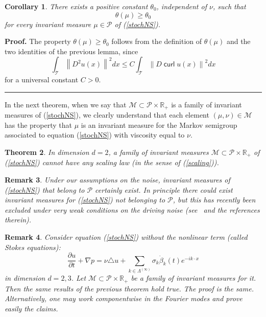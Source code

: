 \documentclass[11pt]{preprint}
\DeclareMathOperator{\Curl}{\mathsf{curl}}
\newtheorem{theorem}{Theorem}[section]
\newtheorem{corollary}[theorem]{Corollary}
\newtheorem{remark}[theorem]{Remark}
\newenvironment{proof}[1][Proof]{\textbf{#1.} }{\ \rule{0.5em}{0.5em}}
\begin{document}
\begin{corollary}
There exists a positive constant $\theta_{0}$, independent of $\nu$, such
that
\[
\theta\left(  \mu\right)  \geq\theta_{0}%
\]
for every invariant measure $\mu\in\mathcal{P}$ of (\ref{stochNS}).
\end{corollary}

\begin{proof}
The property $\theta\left(  \mu\right)  \geq\theta_{0}$ follows from the
definition of $\theta\left(  \mu\right)  $ and the two identities of the
previous lemma, since
\[
\int_{\mathcal{T}}\left\|  D^{2}u\left(  x\right)  \right\|  ^{2}dx\leq
C\int_{\mathcal{T}}\left\|  D\Curl u\left(  x\right)  \right\|  ^{2}dx
\]
for a universal constant $C>0$.
\end{proof}

In the next theorem, when we say that $\mathcal{M}\subset\mathcal{P}%
\times\mathbb{R}_{+}$ is a family of invariant measures of (\ref{stochNS}), we
clearly understand that each element $\left(  \mu,\nu\right)  \in\mathcal{M} $
has the property that $\mu$ is an invariant measure for the Markov semigroup
associated to equation (\ref{stochNS}) with viscosity equal to $\nu$.

\begin{theorem}
In dimension $d=2$, a family of invariant measures $\mathcal{M}\subset
\mathcal{P}\times\mathbb{R}_{+}$ of (\ref{stochNS}) cannot have any scaling
law (in the sense of (\ref{scaling})).
\end{theorem}

\begin{remark}
Under our assumptions on the noise, invariant measures of (\ref{stochNS}) that
belong to $\mathcal{P}$ certainly exist. In principle there could exist invariant measures
for (\ref{stochNS}) not belonging to $\mathcal{P}$, but this has recently been excluded under very weak
conditions on the driving noise (see~\cite{HairMatt} and the
references therein).
\end{remark}

\begin{remark}
Consider equation (\ref{stochNS}) without the nonlinear term (called Stokes
equations):
\[
\frac{\partial u}{\partial t}+\nabla p=\nu\triangle u+\sum_{
k\in\Lambda^{(\infty)}}\sigma_k {\dot\beta}_k(t)
e^{-ik\cdot x}
\]
in dimension $d=2,3$. Let $\mathcal{M}\subset\mathcal{P}\times\mathbb{R}_{+}$
be a family of invariant measures for it. Then the same results of the
previous theorem hold true. The proof is the same. Alternatively, one may work
componentwise in the Fourier modes and prove easily the claims.
\end{remark}
\end{document}
